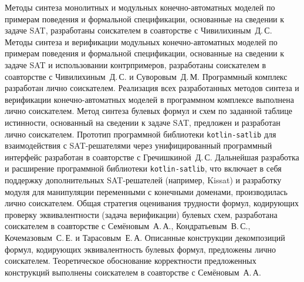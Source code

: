 %
\contribution
%
Методы синтеза монолитных и модульных конечно-автоматных моделей по примерам поведения и формальной спецификации, основанные на сведении к задаче SAT, разработаны соискателем в соавторстве с Чивилихиным~Д.\,С.
Методы синтеза и верификации модульных конечно-автоматных моделей по примерам поведения и формальной спецификации, основанные на сведении к задаче SAT и использовании контрпримеров, разработаны соискателем в соавторстве с Чивилихиным~Д.\,С. и Суворовым~Д.\,М.
Программный комплекс  разработан лично соискателем.
Реализация всех разработанных методов синтеза и верификации конечно-автоматных моделей в программном комплексе  выполнена лично соискателем.
Метод синтеза булевых формул и схем по заданной таблице истинности, основанный на сведении к задаче SAT, предложен и разработан лично соискателем.
Прототип программной библиотеки \texttt{kotlin-satlib} для взаимодействия с SAT-решателями через унифицированный программный интерфейс разработан в соавторстве с Гречишкиной~Д.\,С.
Дальнейшая разработка и расширение программной библиотеки \texttt{kotlin-satlib}, что включает в себя поддержку дополнительных SAT-решателей (например, Kissat) и разработку модуля для манипуляции переменными с конечными доменами, производилась лично соискателем.
Общая стратегия оценивания трудности формул, кодирующих проверку эквивалентности (задача верификации) булевых схем, разработана соискателем в соавторстве с Семёновым~А.\,А., Кондратьевым~В.\,С., Кочемазовым~С.\,Е. и Тарасовым~Е.\,А.
Описанные конструкции декомпозиций формул, кодирующих эквивалентность булевых формул, предложены лично соискателем.
Теоретическое обоснование корректности предложенных конструкций выполнены соискателем в соавторстве с Семёновым~А.\,А.

